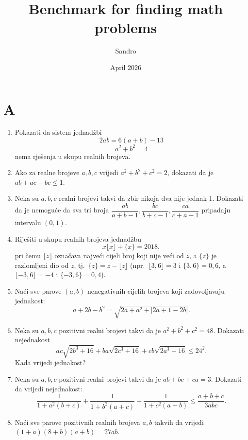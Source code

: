 \documentclass{article}
\title{Benchmark for finding math problems}
\author{Sandro}
\date{April 2026}
\begin{document}
\maketitle

\section{A}

\begin{enumerate}
    \item Pokazati da sistem jednad\v{z}bi
    \[
    2ab = 6(a+b) - 13
    \]
    \[
    a^2 + b^2 = 4
    \]
    nema rje\v{s}enja u skupu realnih brojeva.

    \item Ako za realne brojeve $a, b, c$ vrijedi $a^2 + b^2 + c^2 = 2$, dokazati da je $ab + ac - bc \le 1$.

    \item Neka su $a, b, c$ realni brojevi takvi da zbir nikoja dva nije jednak 1. Dokazati da je nemogu\'ce da sva tri broja $\dfrac{ab}{a+b-1}, \dfrac{bc}{b+c-1}, \dfrac{ca}{c+a-1}$ pripadaju intervalu $(0,1)$.

    \item Rije\v{s}iti u skupu realnih brojeva jednad\v{z}bu
    \[
    x\lfloor x \rfloor + \{x\} = 2018,
    \]
    pri \v{c}emu $\lfloor z \rfloor$ ozna\v{c}ava najve\'ci cijeli broj koji nije ve\'ci od $z$, a $\{z\}$ je razlomljeni dio od $z$, tj.\ $\{z\} = z - \lfloor z \rfloor$ (npr.\ $\lfloor 3{,}6 \rfloor = 3$ i $\{3{,}6\} = 0{,}6$, a $\lfloor -3{,}6 \rfloor = -4$ i $\{-3{,}6\} = 0{,}4$).

    \item Na\'ci sve parove $(a, b)$ nenegativnih cijelih brojeva koji zadovoljavaju jednakost:
    \[
    a + 2b - b^2 = \sqrt{2a + a^2 + |2a + 1 - 2b|}.
    \]

    \item Neka su $a, b, c$ pozitivni realni brojevi takvi da je $a^2 + b^2 + c^2 = 48$. Dokazati nejednakost
    \[
    ac\sqrt{2b^3 + 16} + ba\sqrt{2c^3 + 16} + cb\sqrt{2a^3 + 16} \le 24^2.
    \]
    Kada vrijedi jednakost?

    \item Neka su $a, b, c$ pozitivni realni brojevi takvi da je $ab + bc + ca = 3$. Dokazati da vrijedi nejednakost:
    \[
    \frac{1}{1 + a^2(b+c)} + \frac{1}{1 + b^2(a+c)} + \frac{1}{1 + c^2(a+b)} \le \frac{a+b+c}{3abc}.
    \]

    \item Na\'ci sve parove pozitivnih realnih brojeva $a, b$ takvih da vrijedi $(1+a)(8+b)(a+b) = 27ab$.


\end{enumerate}
\end{document}
